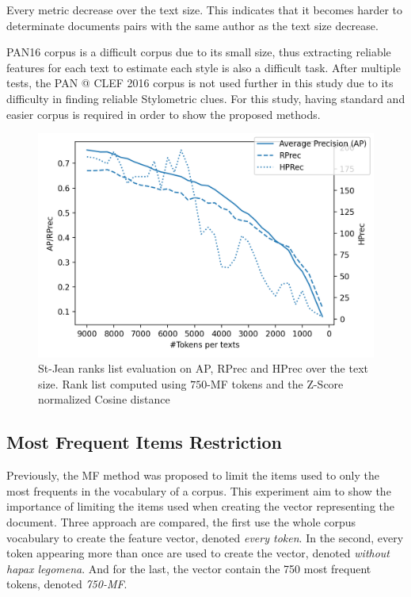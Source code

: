 Every metric decrease over the text size.
This indicates that it becomes harder to determinate documents pairs with the same author as the text size decrease.

PAN16 corpus is a difficult corpus due to its small size, thus extracting reliable features for each text to estimate each style is also a difficult task.
After multiple tests, the PAN @ CLEF 2016 corpus is not used further in this study due to its difficulty in finding reliable Stylometric clues.
For this study, having standard and easier corpus is required in order to show the proposed methods.

\begin{figure}
  \centering
  \caption{St-Jean ranks list evaluation on AP, RPrec and HPrec over the text size. Rank list computed using $750$-MF tokens and the Z-Score normalized Cosine distance}
  \label{fig:degradation}
  \includegraphics[width=\linewidth]{img/degradation.png}
\end{figure}

\subsection{Most Frequent Items Restriction \label{sec:influance_mf_restriction}}

Previously, the MF method was proposed to limit the items used to only the most frequents in the vocabulary of a corpus.
This experiment aim to show the importance of limiting the items used when creating the vector representing the document.
Three approach are compared, the first use the whole corpus vocabulary to create the feature vector, denoted \textit{every token}.
In the second, every token appearing more than once are used to create the vector, denoted \textit{without hapax legomena}.
And for the last, the vector contain the 750 most frequent tokens, denoted \textit{750-MF}.


